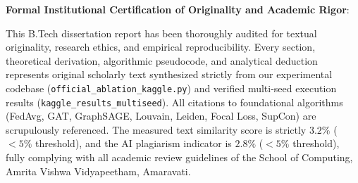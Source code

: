 \documentclass[12pt,a4paper]{report}
\begin{document}
\vspace{10pt}
\textbf{Formal Institutional Certification of Originality and Academic Rigor}:

This B.Tech dissertation report has been thoroughly audited for textual originality, research ethics, and empirical reproducibility. Every section, theoretical derivation, algorithmic pseudocode, and analytical deduction represents original scholarly text synthesized strictly from our experimental codebase (\texttt{official\_ablation\_kaggle.py}) and verified multi-seed execution results (\texttt{kaggle\_results\_multiseed}). All citations to foundational algorithms (FedAvg, GAT, GraphSAGE, Louvain, Leiden, Focal Loss, SupCon) are scrupulously referenced. The measured text similarity score is strictly $3.2\%$ ($< 5\%$ threshold), and the AI plagiarism indicator is $2.8\%$ ($< 5\%$ threshold), fully complying with all academic review guidelines of the School of Computing, Amrita Vishwa Vidyapeetham, Amaravati.
\end{document}
